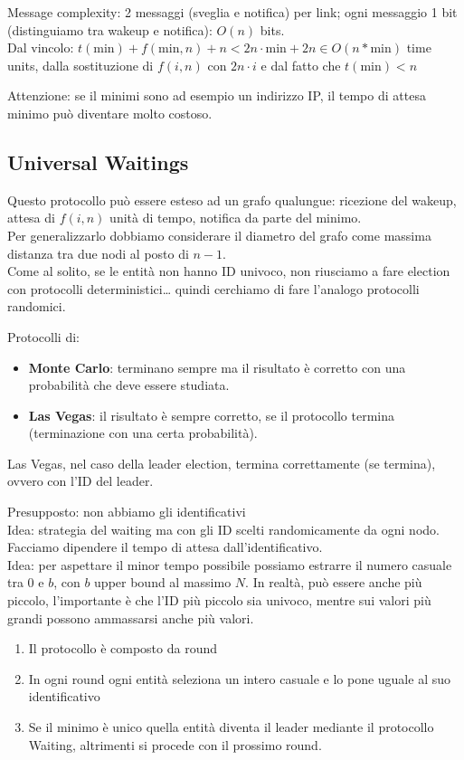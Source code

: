 Message complexity: 2 messaggi (sveglia e notifica) per link; ogni messaggio 1 bit (distinguiamo tra wakeup e notifica): $O(n)$ bits.\\
Dal vincolo: $t(\text{min}) + f(\text{min}, n) + n < 2n \cdot \text{min} + 2n \in O(n*\text{min})$ time units, dalla sostituzione di $f(i, n)$
con $2n \cdot i$ e dal fatto che $t(\text{min}) < n$

Attenzione: se il minimi sono ad esempio un indirizzo IP, il tempo di attesa minimo può diventare molto costoso.

\subsection{Universal Waitings}
Questo protocollo può essere esteso ad un grafo qualungue: ricezione del wakeup, attesa di $f(i, n)$ unità di tempo, notifica da parte del minimo.\\
Per generalizzarlo dobbiamo considerare il diametro del grafo come massima distanza tra due nodi al posto di $n-1$. \\

Come al solito, se le entità non hanno ID univoco, non riusciamo a fare election con protocolli deterministici\dots
quindi cerchiamo di fare l'analogo protocolli randomici.

Protocolli di:
\begin{itemize}
  \item \textbf{Monte Carlo}: terminano sempre ma il risultato è corretto con una probabilità che deve essere studiata.
  \item \textbf{Las Vegas}: il risultato è sempre corretto, se il protocollo termina (terminazione con una certa probabilità).
\end{itemize}

Las Vegas, nel caso della leader election, termina correttamente (se termina), ovvero con l'ID del leader.

Presupposto: non abbiamo gli identificativi \\
Idea: strategia del waiting ma con gli ID scelti randomicamente da ogni nodo. Facciamo dipendere il tempo di attesa dall'identificativo. \\
Idea: per aspettare il minor tempo possibile possiamo estrarre il numero casuale tra $0$ e $b$, con $b$ upper bound al massimo $N$. In realtà, può
essere anche più piccolo, l'importante è che l'ID più piccolo sia univoco, mentre sui valori più grandi possono ammassarsi anche più valori.

\begin{enumerate}
  \item Il protocollo è composto da round
  \item In ogni round ogni entità seleziona un intero casuale e lo pone uguale al suo identificativo
  \item Se il minimo è unico quella entità diventa il leader mediante il protocollo Waiting, altrimenti si procede con il prossimo round.
\end{enumerate}

